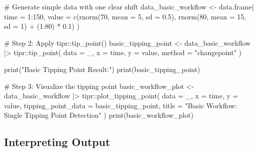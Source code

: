 \documentclass[
  10pt,
  letterpaper,
  DIV=11,
  numbers=noendperiod]{scrartcl}
\newenvironment{Shaded}{\begin{snugshade}}{\end{snugshade}}
\newcommand{\AttributeTok}[1]{\textcolor[rgb]{0.40,0.45,0.13}{#1}}
\newcommand{\CommentTok}[1]{\textcolor[rgb]{0.37,0.37,0.37}{#1}}
\newcommand{\DecValTok}[1]{\textcolor[rgb]{0.68,0.00,0.00}{#1}}
\newcommand{\FloatTok}[1]{\textcolor[rgb]{0.68,0.00,0.00}{#1}}
\newcommand{\FunctionTok}[1]{\textcolor[rgb]{0.28,0.35,0.67}{#1}}
\newcommand{\NormalTok}[1]{\textcolor[rgb]{0.00,0.23,0.31}{#1}}
\newcommand{\OtherTok}[1]{\textcolor[rgb]{0.00,0.23,0.31}{#1}}
\newcommand{\SpecialCharTok}[1]{\textcolor[rgb]{0.37,0.37,0.37}{#1}}
\newcommand{\StringTok}[1]{\textcolor[rgb]{0.13,0.47,0.30}{#1}}
\begin{document}
\begin{Shaded}
\begin{Highlighting}[]
\CommentTok{\# Generate simple data with one clear shift}
\NormalTok{data\_basic\_workflow }\OtherTok{\textless{}{-}} \FunctionTok{data.frame}\NormalTok{(}
  \AttributeTok{time =} \DecValTok{1}\SpecialCharTok{:}\DecValTok{150}\NormalTok{,}
  \AttributeTok{value =} \FunctionTok{c}\NormalTok{(}\FunctionTok{rnorm}\NormalTok{(}\DecValTok{70}\NormalTok{, }\AttributeTok{mean =} \DecValTok{5}\NormalTok{, }\AttributeTok{sd =} \FloatTok{0.5}\NormalTok{), }\FunctionTok{rnorm}\NormalTok{(}\DecValTok{80}\NormalTok{, }\AttributeTok{mean =} \DecValTok{15}\NormalTok{, }\AttributeTok{sd =} \DecValTok{1}\NormalTok{) }\SpecialCharTok{+}\NormalTok{ (}\DecValTok{1}\SpecialCharTok{:}\DecValTok{80}\NormalTok{) }\SpecialCharTok{*} \FloatTok{0.1}\NormalTok{)}
\NormalTok{)}

\CommentTok{\# Step 2: Apply tipr::tip\_point()}
\NormalTok{basic\_tipping\_point }\OtherTok{\textless{}{-}}\NormalTok{ data\_basic\_workflow }\SpecialCharTok{|\textgreater{}}
\NormalTok{  tipr}\SpecialCharTok{::}\FunctionTok{tip\_point}\NormalTok{(}
    \AttributeTok{data =}\NormalTok{ \_,}
    \AttributeTok{x =}\NormalTok{ time,}
    \AttributeTok{y =}\NormalTok{ value,}
    \AttributeTok{method =} \StringTok{"changepoint"}
\NormalTok{  )}

\FunctionTok{print}\NormalTok{(}\StringTok{"Basic Tipping Point Result:"}\NormalTok{)}
\FunctionTok{print}\NormalTok{(basic\_tipping\_point)}

\CommentTok{\# Step 3: Visualize the tipping point}
\NormalTok{basic\_workflow\_plot }\OtherTok{\textless{}{-}}\NormalTok{ data\_basic\_workflow }\SpecialCharTok{|\textgreater{}}
\NormalTok{  tipr}\SpecialCharTok{::}\FunctionTok{plot\_tipping\_point}\NormalTok{(}
    \AttributeTok{data =}\NormalTok{ \_,}
    \AttributeTok{x =}\NormalTok{ time,}
    \AttributeTok{y =}\NormalTok{ value,}
    \AttributeTok{tipping\_point\_data =}\NormalTok{ basic\_tipping\_point,}
    \AttributeTok{title =} \StringTok{"Basic Workflow: Single Tipping Point Detection"}
\NormalTok{  )}
\FunctionTok{print}\NormalTok{(basic\_workflow\_plot)}
\end{Highlighting}
\end{Shaded}

\subsection{Interpreting Output}\label{interpreting-output}
\end{document}

